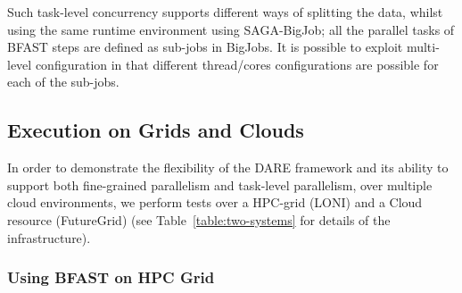 \documentclass{sig-alternate}
\begin{document}
Such task-level concurrency supports different ways of splitting the
data, whilst using the same runtime environment using SAGA-BigJob; all
the parallel tasks of BFAST steps are defined as sub-jobs in BigJobs.
It is possible to exploit multi-level configuration in that different
thread/cores configurations are possible for each of the sub-jobs.







\subsection{Execution on Grids and Clouds}

In order to demonstrate the flexibility of the DARE framework and its
ability to support both fine-grained parallelism and task-level
parallelism, over multiple cloud environments, we perform tests over a
HPC-grid (LONI) and a Cloud resource (FutureGrid) (see
Table~\ref{table:two-systems} for details of the infrastructure).


\subsubsection{Using BFAST on HPC Grid}
\end{document}
